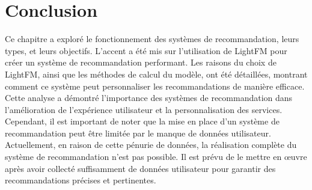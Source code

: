 \documentclass[edit,12pt,a4paper,ChapStyle,oneside,doubleinterligne]{report}
\begin{document}
\section{Conclusion}
Ce chapitre a exploré le fonctionnement des systèmes de recommandation, leurs types, et leurs objectifs. L'accent a été mis sur l'utilisation de LightFM pour créer un système de recommandation performant. Les raisons du choix de LightFM, ainsi que les méthodes de calcul du modèle, ont été détaillées, montrant comment ce système peut personnaliser les recommandations de manière efficace. Cette analyse a démontré l'importance des systèmes de recommandation dans l'amélioration de l'expérience utilisateur et la personnalisation des services.
\newline
Cependant, il est important de noter que la mise en place d'un système de recommandation peut être limitée par le manque de données utilisateur. Actuellement, en raison de cette pénurie de données, la réalisation complète du système de recommandation n'est pas possible. Il est prévu de le mettre en œuvre après avoir collecté suffisamment de données utilisateur pour garantir des recommandations précises et pertinentes.

\end{document}

